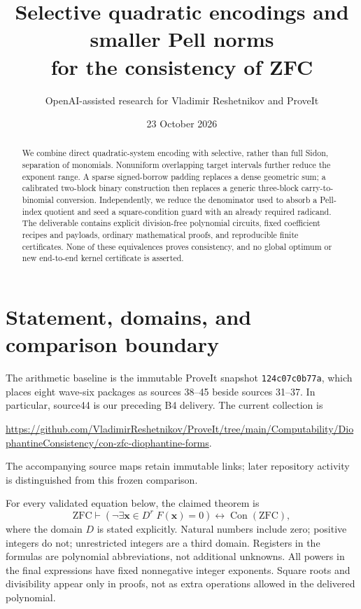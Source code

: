 \documentclass[11pt]{article}
\title{Selective quadratic encodings and smaller Pell norms\\for the consistency of ZFC}
\author{OpenAI-assisted research for Vladimir Reshetnikov and ProveIt}
\date{23 October 2026}
\newcommand{\Con}{\operatorname{Con}}
\begin{document}
\maketitle
\begin{abstract}
We combine direct quadratic-system encoding with selective, rather than
full Sidon, separation of monomials. Nonuniform overlapping target intervals
further reduce the exponent range. A sparse signed-borrow padding replaces
a dense geometric sum; a calibrated two-block binary construction then
replaces a generic three-block carry-to-binomial conversion. Independently,
we reduce the denominator used to absorb a Pell-index quotient and seed a
square-condition guard with an already required radicand. The deliverable
contains explicit division-free polynomial circuits, fixed coefficient
recipes and payloads, ordinary mathematical proofs, and reproducible
finite certificates. None of these equivalences proves consistency, and
no global optimum or new end-to-end kernel certificate is asserted.
\end{abstract}

\section{Statement, domains, and comparison boundary}
The arithmetic baseline is the immutable ProveIt snapshot
\texttt{124c07c0b77a}, which places eight
wave-six packages as sources 38--45 beside sources 31--37. In particular,
source44 is our preceding B4 delivery. The current collection is
\begin{center}\small
\url{https://github.com/VladimirReshetnikov/ProveIt/tree/main/Computability/DiophantineConsistency/con-zfc-diophantine-forms}.
\end{center}
The accompanying source maps retain immutable links; later repository
activity is distinguished from this frozen comparison.

For every validated equation below, the claimed theorem is
\[
 \mathrm{ZFC}\vdash
 \left(\neg\exists\mathbf x\in D^r\;F(\mathbf x)=0\right)
 \longleftrightarrow\Con(\mathrm{ZFC}),
\]
where the domain $D$ is stated explicitly. Natural numbers include zero;
positive integers do not; unrestricted integers are a third domain.
Registers in the formulas are polynomial abbreviations, not additional
unknowns. All powers in the final expressions have fixed nonnegative
integer exponents. Square roots and divisibility appear only in proofs,
not as extra operations allowed in the delivered polynomial.
\end{document}
